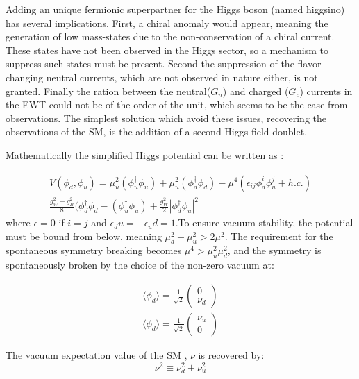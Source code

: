 Adding an unique fermionic superpartner for the Higgs boson (named higgsino) has several implications. First, a chiral anomaly would appear, meaning the generation of low mass-states due to the non-conservation of a chiral current. These states have not been observed in the Higgs sector, so a mechanism to suppress such states must be present. Second the suppression of the flavor-changing neutral currents, which are not observed in nature either, is not granted. Finally the ration between the neutral($G_n$) and charged ($G_c$) currents in the EWT could not be of the order of the unit, which seems to be the case from observations. The simplest solution which avoid these issues, recovering the observations of the SM, is the addition of a second Higgs field doublet.

Mathematically the simplified Higgs potential can be written as \cite{Nagashima:2014tva}:

\begin{multline}
    V(\phi_d , \phi_u) = \mu^{2}_u (\phi^{\dagger}_u \phi_u) + \mu^{2}_u (\phi^{\dagger}_d \phi_d) - \mu^{4}(\epsilon_{ij}\phi^{i}_d \phi^{j}_u + h.c.) \\ \frac{g^{2}_W + g^{2}_B}{8}(\phi^{\dagger}_d \phi_d - (\phi^{\dagger}_u \phi_u) + \frac{g^{2}_W}{2} | \phi^{\dagger}_d \phi_u |^2
\end{multline}
where $\epsilon = 0$ if $i = j$ and $\epsilon_du = -\epsilon_ud = 1$.To ensure vacuum stability, the potential must be bound from below, meaning $\mu_{d}^2 + \mu_{u}^2 > 2\mu^2$. The requirement for the spontaneous symmetry breaking becomes $\mu^4 > \mu_{u}^2 \mu_{d}^2$, and the symmetry is spontaneously broken by the choice of the non-zero vacuum at:

\begin{multline}
    \langle \phi_d \rangle = \frac{1}{\sqrt{2}} \begin{pmatrix} 0 \\ \nu_d \end{pmatrix} \\
    \langle \phi_d \rangle = \frac{1}{\sqrt{2}} \begin{pmatrix} \nu_u \\ 0 \end{pmatrix}
\end{multline}

The vacuum expectation value of the SM , $\nu$ is recovered by:
\begin{equation}
    \nu^2 \equiv \nu_{d}^2 + \nu_{u}^2
\end{equation}

